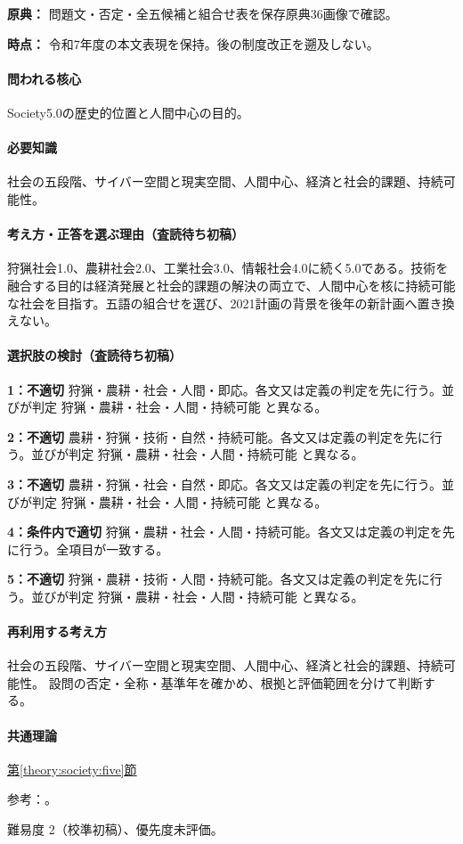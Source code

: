 \noindent\textbf{原典：} 問題文・否定・全五候補と組合せ表を保存原典36画像で確認。\par

\noindent\textbf{時点：} 令和7年度の本文表現を保持。後の制度改正を遡及しない。\par

\paragraph{問われる核心} Society5.0の歴史的位置と人間中心の目的。

\paragraph{必要知識} 社会の五段階、サイバー空間と現実空間、人間中心、経済と社会的課題、持続可能性。

\paragraph{考え方・正答を選ぶ理由（査読待ち初稿）} 狩猟社会1.0、農耕社会2.0、工業社会3.0、情報社会4.0に続く5.0である。技術を融合する目的は経済発展と社会的課題の解決の両立で、人間中心を核に持続可能な社会を目指す。五語の組合せを選び、2021計画の背景を後年の新計画へ置き換えない。

\paragraph{選択肢の検討（査読待ち初稿）}\mbox{}\par

\noindent\textbf{1：不適切} 狩猟・農耕・社会・人間・即応。各文又は定義の判定を先に行う。並びが判定 狩猟・農耕・社会・人間・持続可能 と異なる。\par

\noindent\textbf{2：不適切} 農耕・狩猟・技術・自然・持続可能。各文又は定義の判定を先に行う。並びが判定 狩猟・農耕・社会・人間・持続可能 と異なる。\par

\noindent\textbf{3：不適切} 農耕・狩猟・社会・自然・即応。各文又は定義の判定を先に行う。並びが判定 狩猟・農耕・社会・人間・持続可能 と異なる。\par

\noindent\textbf{4：条件内で適切} 狩猟・農耕・社会・人間・持続可能。各文又は定義の判定を先に行う。全項目が一致する。\par

\noindent\textbf{5：不適切} 狩猟・農耕・技術・人間・持続可能。各文又は定義の判定を先に行う。並びが判定 狩猟・農耕・社会・人間・持続可能 と異なる。\par

\paragraph{再利用する考え方} 社会の五段階、サイバー空間と現実空間、人間中心、経済と社会的課題、持続可能性。 設問の否定・全称・基準年を確かめ、根拠と評価範囲を分けて判断する。

\paragraph{共通理論} \hyperref[theory:society:five]{第\ref*{theory:society:five}節}

\par 参考：\cite{eth54_society2021}。

\par 難易度 2（校準初稿）、優先度未評価。
